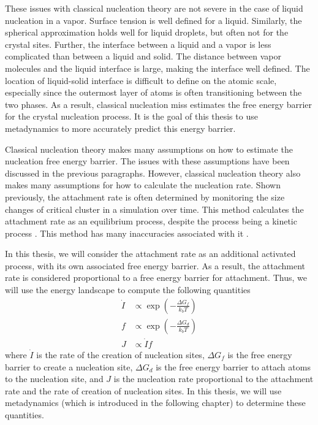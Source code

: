 These issues with classical nucleation theory are not severe in the case of liquid nucleation in a vapor.  Surface tension is well defined for a liquid.  Similarly, the spherical approximation holds well for liquid droplets, but often not for the crystal sites.  Further, the interface between a liquid and a vapor is less complicated than between a liquid and solid.  The distance between vapor molecules and the liquid interface is large, making the interface well defined.  The location of liquid-solid interface is difficult to define on the atomic scale, especially since the outermost layer of atoms is often transitioning between the two phases.  As a result, classical nucleation miss estimates the free energy barrier for the crystal nucleation process.  It is the goal of this thesis to use metadynamics to more accurately predict this energy barrier.

Classical nucleation theory makes many assumptions on how to estimate the nucleation free energy barrier.  The issues with these assumptions have been discussed in the previous paragraphs.  However, classical nucleation theory also makes many assumptions for how to calculate the nucleation rate.  Shown previously, the attachment rate is often determined by monitoring the size changes of critical cluster in a simulation over time.  This method calculates the attachment rate as an equilibrium process, despite the process being a kinetic process \cite{Schmelzer2005}.  This method has many inaccuracies associated with it \cite{Schmelzer2005}.

In this thesis, we will consider the attachment rate as an additional activated process, with its own associated free energy barrier.  As a result, the attachment rate is considered proportional to a free energy barrier for attachment. Thus, we will use the energy landscape to compute the following quantities
\begin{equation}
	\begin{split}
	\dot{I} &\propto \exp\left(-\frac{\Delta G_f}{k_bT}\right)\\
	f &\propto \exp\left(-\frac{\Delta G_d}{k_bT}\right)\\
	J &\propto \dot{I}f 
	\end{split}
\end{equation}
where $\dot{I}$ is the rate of the creation of nucleation sites, $\Delta G_f$ is the free energy barrier to create a nucleation site, $\Delta G_d$ is the free energy barrier to attach atoms to the nucleation site, and $J$ is the nucleation rate proportional to the attachment rate and the rate of creation of nucleation sites.  In this thesis, we will use metadynamics (which is introduced in the following chapter) to determine these quantities.

